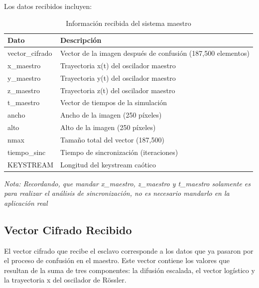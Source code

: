 \documentclass[12pt,a4paper]{article}
\begin{document}
	Los datos recibidos incluyen:
	
	\begin{table}[H]
		\centering
		\caption{Información recibida del sistema maestro}
		\label{tab:received_data}
		\begin{tabular}{@{}ll@{}}
			\toprule
			\textbf{Dato} & \textbf{Descripción} \\ \midrule
			vector\_cifrado & Vector de la imagen después de confusión (187,500 elementos) \\
			x\_maestro & Trayectoria x(t) del oscilador maestro \\
			y\_maestro & Trayectoria y(t) del oscilador maestro \\
			z\_maestro & Trayectoria z(t) del oscilador maestro \\
			t\_maestro & Vector de tiempos de la simulación \\
			ancho & Ancho de la imagen (250 píxeles) \\
			alto & Alto de la imagen (250 píxeles) \\
			nmax & Tamaño total del vector (187,500) \\
			tiempo\_sinc & Tiempo de sincronización (iteraciones) \\
			KEYSTREAM & Longitud del keystream caótico \\ \bottomrule
		\end{tabular}
	\end{table}
	
	\textit{Nota: Recordando, que mandar x\_maestro, z\_maestro y t\_maestro solamente es para realizar el análisis de sincronización, no es necesario mandarlo en la aplicación real}
	
	\subsection{Vector Cifrado Recibido}
	
	El vector cifrado que recibe el esclavo corresponde a los datos que ya pasaron por el proceso de confusión en el maestro. Este vector contiene los valores que resultan de la suma de tres componentes: la difusión escalada, el vector logístico y la trayectoria x del oscilador de Rössler.
	
\end{document}
